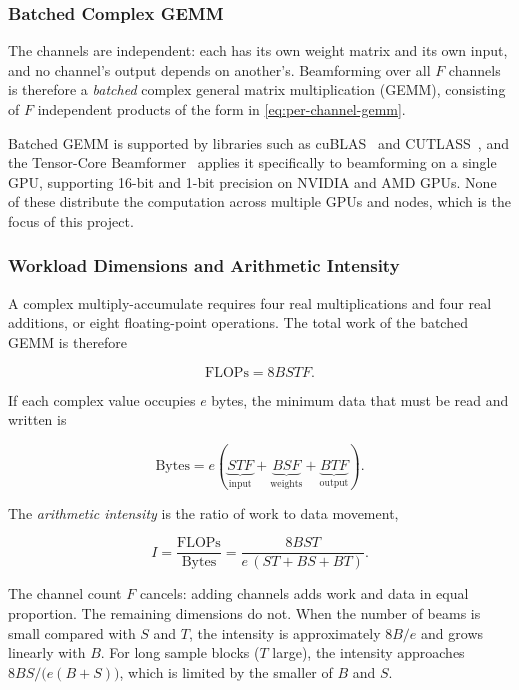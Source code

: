 \subsubsection{Batched Complex GEMM}
\label{sec:batched-complex-gemm}

The channels are independent: each has its own weight matrix and its own input, and no channel's output depends on another's. Beamforming over all $F$ channels is therefore a \emph{batched} complex general matrix multiplication (GEMM), consisting of $F$ independent products of the form in \cref{eq:per-channel-gemm}.

Batched GEMM is supported by libraries such as cuBLAS~\cite{cublasDocs} and CUTLASS~\cite{cutlass}, and the Tensor-Core Beamformer~\cite{oostrum2025tcbf} applies it specifically to beamforming on a single GPU, supporting 16-bit and 1-bit precision on NVIDIA and AMD GPUs. None of these distribute the computation across multiple GPUs and nodes, which is the focus of this project.

\subsubsection{Workload Dimensions and Arithmetic Intensity}
\label{sec:workload-dimensions-and-arithmetic-intensity}

A complex multiply-accumulate requires four real multiplications and four real additions, or eight floating-point operations. The total work of the batched GEMM is therefore

\begin{equation}
  \text{FLOPs} = 8BSTF.
  \label{eq:flops}
\end{equation}

If each complex value occupies $e$ bytes, the minimum data that must be read and written is

\begin{equation}
  \text{Bytes} = e\left( \underbrace{STF}_{\text{input}} + \underbrace{BSF}_{\text{weights}} + \underbrace{BTF}_{\text{output}} \right).
  \label{eq:bytes}
\end{equation}

The \emph{arithmetic intensity} is the ratio of work to data movement,

\begin{equation}
  I = \frac{\text{FLOPs}}{\text{Bytes}} = \frac{8BST}{e\,(ST + BS + BT)}.
  \label{eq:arithmetic-intensity}
\end{equation}

The channel count $F$ cancels: adding channels adds work and data in equal proportion. The remaining dimensions do not. When the number of beams is small compared with $S$ and $T$, the intensity is approximately $8B/e$ and grows linearly with $B$. For long sample blocks ($T$ large), the intensity approaches $8BS/\big(e(B+S)\big)$, which is limited by the smaller of $B$ and $S$.

